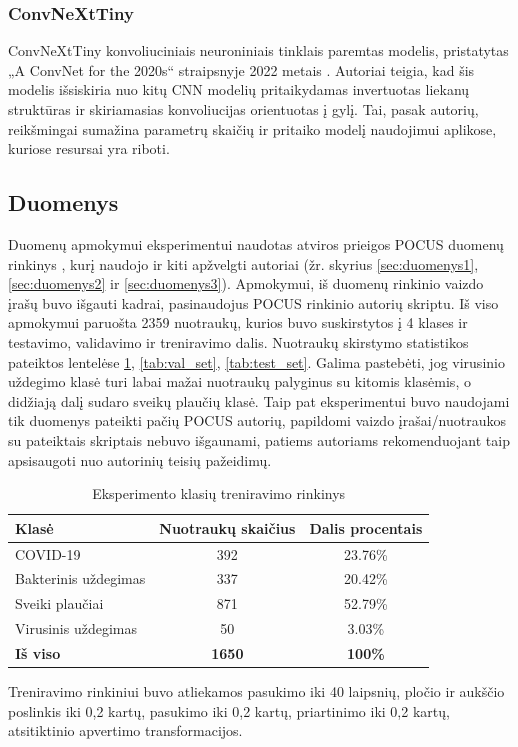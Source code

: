 \documentclass[fleqn]{VUMIFKompMagistrinis}
\begin{document}
\subsubsection{ConvNeXtTiny}
ConvNeXtTiny konvoliuciniais neuroniniais tinklais paremtas modelis, pristatytas „A ConvNet for the 2020s“ straipsnyje 2022 metais \cite{tiny}. Autoriai teigia, kad šis modelis išsiskiria nuo kitų CNN modelių pritaikydamas invertuotas liekanų struktūras ir skiriamasias konvoliucijas orientuotas į gylį. Tai, pasak autorių, reikšmingai sumažina parametrų skaičių ir pritaiko modelį naudojimui aplikose, kuriose resursai yra riboti.
\subsection{Duomenys}
Duomenų apmokymui eksperimentui naudotas atviros prieigos POCUS duomenų rinkinys \cite{born2021accelerating}, kurį naudojo ir kiti apžvelgti autoriai (žr. skyrius \ref{sec:duomenys1}, \ref{sec:duomenys2} ir \ref{sec:duomenys3}). Apmokymui, iš duomenų rinkinio vaizdo įrašų buvo išgauti kadrai, pasinaudojus POCUS rinkinio autorių skriptu. Iš viso apmokymui paruošta 2359 nuotraukų, kurios buvo suskirstytos į 4 klases ir testavimo, validavimo ir treniravimo dalis. Nuotraukų skirstymo statistikos pateiktos lentelėse \ref{tab:train_set}, \ref{tab:val_set}, \ref{tab:test_set}. Galima pastebėti, jog virusinio uždegimo klasė turi labai mažai nuotraukų palyginus su kitomis klasėmis, o didžiają dalį sudaro sveikų plaučių klasė. Taip pat eksperimentui buvo naudojami tik duomenys pateikti pačių POCUS autorių, papildomi vaizdo įrašai/nuotraukos su pateiktais skriptais nebuvo išgaunami, patiems autoriams rekomenduojant taip apsisaugoti nuo autorinių teisių pažeidimų.
\begin{table}[H]\footnotesize
  \centering
  \caption{Eksperimento klasių treniravimo rinkinys}
  \begin{tabular}{|l|c|c|}
    \hline
    Klasė       & Nuotraukų skaičius & Dalis procentais \\ \hline
    COVID-19       & 392              & 23.76\%                     \\
    Bakterinis uždegimas   & 337              & 20.42\%                     \\
    Sveiki plaučiai     & 871              & 52.79\%                     \\
    Virusinis uždegimas       & 50               & 3.03\%                      \\
    \textbf{Iš viso} & \textbf{1650} & \textbf{100\%}              \\ \hline
  \end{tabular}
  \label{tab:train_set}
\end{table}
Treniravimo rinkiniui buvo atliekamos pasukimo iki 40 laipsnių, pločio ir aukščio poslinkis iki 0,2 kartų, pasukimo iki 0,2 kartų, priartinimo iki 0,2 kartų, atsitiktinio apvertimo transformacijos.
\end{document}
